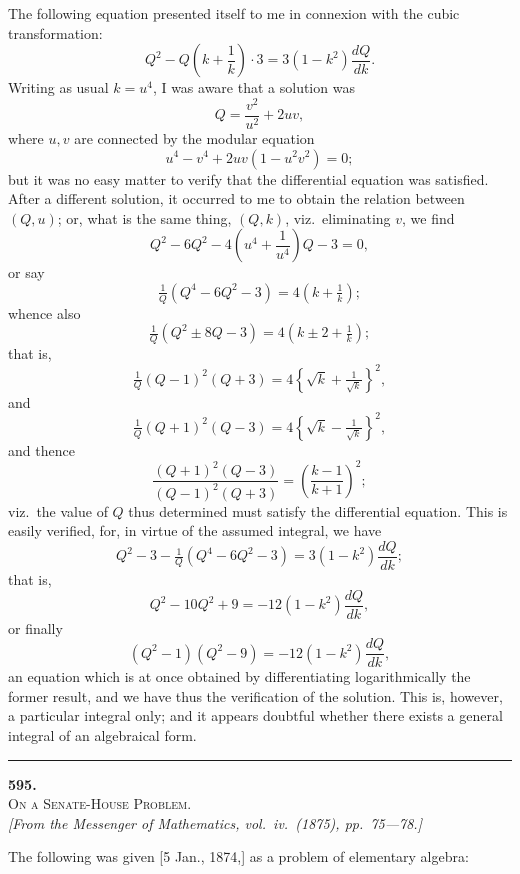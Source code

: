 \documentclass[11pt]{article}
\begin{document}
The following equation presented itself to me in connexion with the cubic transformation:
\[
Q^{2}-Q\!\left(k+\frac{1}{k}\right)\cdot 3=3(1-k^{2})\frac{dQ}{dk}.
\]
Writing as usual $k=u^{4}$, I was aware that a solution was
\[
Q=\frac{v^{2}}{u^{2}}+2uv,
\]
where $u,v$ are connected by the modular equation
\[
u^{4}-v^{4}+2uv(1-u^{2}v^{2})=0;
\]
but it was no easy matter to verify that the differential equation was satisfied. After
a different solution, it occurred to me to obtain the relation between $(Q,u)$; or, what
is the same thing, $(Q,k)$, viz.\ eliminating $v$, we find
\[
Q^{2}-6Q^{2}-4\!\left(u^{4}+\frac{1}{u^{4}}\right)Q-3=0,
\]
or say
\[
\tfrac{1}{Q}(Q^{4}-6Q^{2}-3)=4\!\left(k+\tfrac{1}{k}\right);
\]
whence also
\[
\tfrac{1}{Q}(Q^{2}\pm 8Q-3)=4\!\left(k\pm 2+\tfrac{1}{k}\right);
\]
that is,
\[
\tfrac{1}{Q}(Q-1)^{2}(Q+3)=4\!\left\{\sqrt{k}+\tfrac{1}{\sqrt{k}}\right\}^{2},
\]
and
\[
\tfrac{1}{Q}(Q+1)^{2}(Q-3)=4\!\left\{\sqrt{k}-\tfrac{1}{\sqrt{k}}\right\}^{2},
\]
and thence
\[
\frac{(Q+1)^{2}(Q-3)}{(Q-1)^{2}(Q+3)}=\!\left(\frac{k-1}{k+1}\right)^{2};
\]
viz.\ the value of $Q$ thus determined must satisfy the differential equation. This is
easily verified, for, in virtue of the assumed integral, we have
\[
Q^{2}-3-\tfrac{1}{Q}(Q^{4}-6Q^{2}-3)=3(1-k^{2})\frac{dQ}{dk};
\]
that is,
\[
Q^{2}-10Q^{2}+9=-12(1-k^{2})\frac{dQ}{dk},
\]
or finally
\[
(Q^{2}-1)(Q^{2}-9)=-12(1-k^{2})\frac{dQ}{dk},
\]
an equation which is at once obtained by differentiating logarithmically the former
result, and we have thus the verification of the solution. This is, however, a
particular integral only; and it appears doubtful whether there exists a general
integral of an algebraical form.

\bigskip
\hrule
\bigskip


\begin{center}
{\large\textbf{595.}}\\[4pt]
{\scshape On a Senate-House Problem.}\\[4pt]
\textit{[From the \textit{Messenger of Mathematics}, vol.\ iv.\ (1875), pp.\ 75---78.]}
\end{center}

\medskip

The following was given [5 Jan., 1874,] as a problem of elementary algebra:
\end{document}
